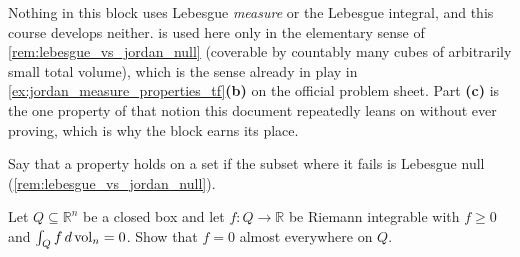 \begin{ainote}
Nothing in this block uses Lebesgue \emph{measure} or the Lebesgue integral, and this course
develops neither.  is used here only in the elementary sense of
\cref{rem:lebesgue_vs_jordan_null} (coverable by countably many cubes of arbitrarily small total
volume), which is the sense already in play in \cref{ex:jordan_measure_properties_tf}\textbf{(b)} on the official problem
sheet. Part \textbf{(c)} is the one property of that notion this document repeatedly leans on
without ever proving, which is why the block earns its place.
\end{ainote}

\begin{exercise}
\label{ex:vanishing_integral_forces_zero_ae}
Say that a property holds  on a set if the subset where it fails is
Lebesgue null (\cref{rem:lebesgue_vs_jordan_null}).

Let $Q \subseteq \mathbb{R}^n$ be a closed box and let $f : Q \to \mathbb{R}$ be Riemann
integrable with $f \geq 0$ and $\int_Q f \,d\operatorname{vol}_n = 0$. Show that $f = 0$ almost everywhere
on $Q$.
\end{exercise}

